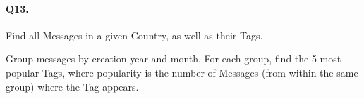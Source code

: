 \paragraph{Q13.}

Find all Messages in a given Country, as well as their Tags.

Group messages by creation year and month. For each group, find the 5
most popular Tags, where popularity is the number of Messages (from
within the same group) where the Tag appears.
